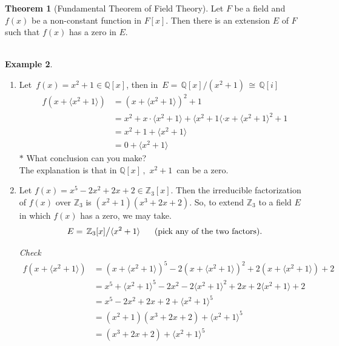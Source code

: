 \documentclass[11pt,a4paper]{article}
\theoremstyle{definition}
\newtheorem{thm}{Theorem}[subsection]
\newtheorem{exa}[thm]{Example}
\begin{document}
\begin{thm}[Fundamental Theorem of Field Theory]
Let $F$ be a field and $f(x)$ be a non-constant function in $F[x]$. Then there is an extension $E$ of $F$ such that $f(x)$ has a zero in $E$.\\\\
\end{thm}





\begin{exa}
\begin{enumerate}
\item Let $\, f(x) = x^2 + 1 \in \mathbb{Q}[x]$, then in $\, E = \,\mathbb{Q}[x]\big/(x^2 + 1)\,  \cong \,\mathbb{Q}[i]$
\begin{align*}
f(x + \langle x^2 + 1\rangle ) & = (x + \langle x^2 + 1\rangle )^2 + 1\\
& = x^2 + x\cdot \langle x^2 + 1\rangle + \langle x^2 + 1\langle\cdot x + \langle x^2 + 1\rangle^2 + 1\\
& = x^2 + 1 + \langle x^2 + 1\rangle\\
& = 0 + \langle x^2 + 1\rangle
\end{align*}
$*$ What conclusion can you make?\\
The explanation is that in $\mathbb{Q}[x]\, ,\, \, x^2 + 1\,$ can be a zero.\\



\item Let $f(x) = x^5  - 2x^2 + 2x + 2\in \mathbb{Z}_3[x]$. Then the irreducible factorization of $f(x)$ over $\mathbb{Z}_3$ is $(x^2 + 1)(x^3 + 2x + 2)$. So, to extend $\mathbb{Z}_3$ to a field $E$ in which $f(x)$ has a zero, we may take. $$E = \,\mathbb{Z}_3[x]\big/\langle x^2 + 1\rangle\hspace{0.6cm} (\text{pick any of the two factors}).$$



\textit{Check}
\begin{align*}
f(x + \langle x^2 + 1\rangle ) & = (x + \langle x^2 + 1\rangle )^5 - 2(x + \langle x^2 + 1\rangle)^2 + 2(x + \langle x^2 + 1\rangle) + 2\\
& = x^5 + \langle x^2 + 1\rangle^5 - 2x^2 - 2\langle x^2 + 1\rangle^2 + 2x + 2\langle x^2 + 1\rangle + 2\\
& = x^5 - 2x^2  + 2x + 2 + \langle x^2 + 1\rangle^5\\
& = (x^2 + 1)(x^3 + 2x + 2) + \langle x^2 + 1\rangle^5\\
& = (x^3 + 2x + 2) + \langle x^2 + 1\rangle^5\\\\
\end{align*}



\end{enumerate}
\end{exa}
\end{document}
